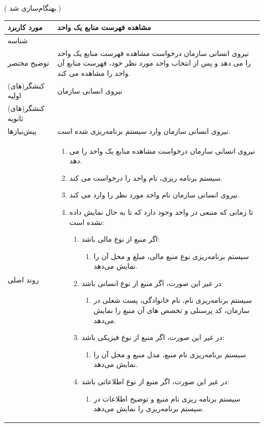 \newpage
({\color{red} بهنگام‌سازی شد.})
\begin{table}[H]
	\centering
	\begin{tabular}{|p{3cm}|p{10cm}|}
		\hline
		مورد کاربرد & مشاهده فهرست منابع یک واحد  \\
		\hline
		شناسه & 
		\stepcounter{usecase_ID}
		\arabic{usecase_ID} \\
		\hline
		توضیح مختصر & نیروی انسانی سازمان درخواست مشاهده فهرست منابع یک واحد را می دهد و پس از انتخاب واحد مورد نظر خود، فهرست منابع آن واحد را مشاهده می کند.\\
		\hline
		کنشگر(های) اولیه & نیروی انسانی سازمان \\
		\hline
		کنشگر(های) ثانویه &  \\
		\hline
		پیش‌نیازها & نیروی انسانی سازمان وارد سیستم برنامه‌ریزی شده است. \\
		\hline
		
		روند اصلی &
		\begin{enumerate}[topsep=0cm,leftmargin=0.5cm]
			\item نیروی انسانی سازمان درخواست مشاهده منابع یک واحد را می دهد.
			\item سیستم برنامه ریزی، نام واحد را درخواست می کند.
			\item نیروی انسانی سازمان نام واحد مورد نظر را وارد می کند. 
			\item تا زمانی که منبعی در واحد وجود دارد که تا به حال نمایش داده نشده است:
			\begin{enumerate}[topsep=0cm,leftmargin=0.5cm]
				\item اگر منبع از نوع مالی باشد:
				\begin{enumerate}[topsep=0cm,leftmargin=0.5cm]
					\item سیستم برنامه‌ریزی نوع منبع مالی، مبلغ و محل آن را نمایش می‌دهد.
				\end{enumerate}
				\item در غیر این صورت، اگر منبع از نوع انسانی باشد:
				\begin{enumerate}[topsep=0cm,leftmargin=0.5cm]
					\item سیستم برنامه‌ریزی نام، نام خانوادگی، پست شغلی در سازمان، کد پرسنلی و تخصص های آن منبع را نمایش می‌دهد.
				\end{enumerate}
				\item در غیر این صورت، اگر منبع از نوع فیزیکی باشد:
				\begin{enumerate}[topsep=0cm,leftmargin=0.5cm]
					\item سیستم برنامه‌ریزی نام منبع، مدل منبع و محل آن را نمایش می‌دهد.
				\end{enumerate}
				\item در غیر این صورت، اگر منبع از نوع اطلاعاتی باشد:
				\begin{enumerate}[topsep=0cm,leftmargin=0.5cm]
					\item سیستم برنامه ریزی نام منبع و توضیح اطلاعات در سیستم برنامه‌ریزی را نمایش می‌دهد. 
				\end{enumerate}	
			\end{enumerate}
		\end{enumerate} \\
		

\end{tabular}
\end{table}
